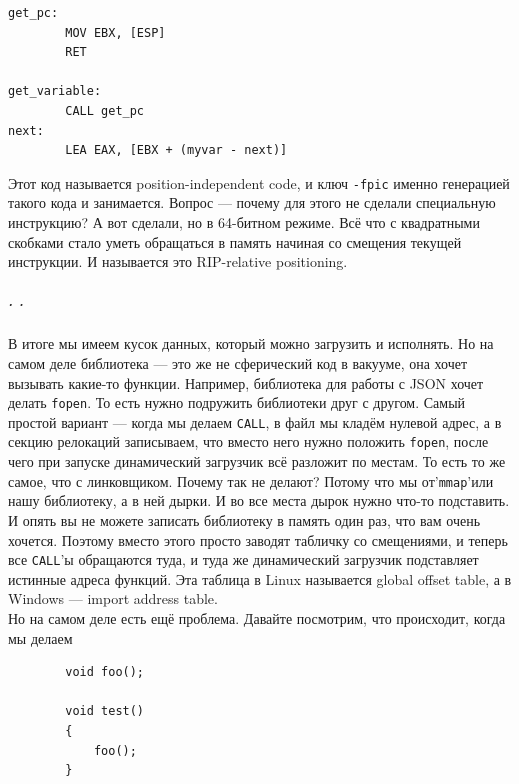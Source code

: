 \documentclass{article}
\newcommand{\asm}[1]{\texttt{#1}}
\begin{document}
    \begin{verbatim}
get_pc:
        MOV EBX, [ESP]
        RET

get_variable:
        CALL get_pc
next:
        LEA EAX, [EBX + (myvar - next)]
    \end{verbatim}
    Этот код называется position-independent code, и ключ \texttt{-fpic} именно генерацией такого кода и занимается. Вопрос --- почему для этого не сделали специальную инструкцию? А вот сделали, но в 64-битном режиме. Всё что с квадратными скобками стало уметь обращаться в память начиная со смещения текущей инструкции. И называется это RIP-relative positioning.
    \subparagraph{. .}
    В итоге мы имеем кусок данных, который можно загрузить и исполнять. Но на самом деле библиотека --- это же не сферический код в вакууме, она хочет вызывать какие-то функции. Например, библиотека для работы с JSON хочет делать \texttt{fopen}. То есть нужно подружить библиотеки друг с другом. Самый простой вариант --- когда мы делаем \asm{CALL}, в файл мы кладём нулевой адрес, а в секцию релокаций записываем, что вместо него нужно положить \texttt{fopen}, после чего при запуске динамический загрузчик всё разложит по местам. То есть то же самое, что с линковщиком. Почему так не делают? Потому что мы от'\texttt{mmap}'или нашу библиотеку, а в ней дырки. И во все места дырок нужно что-то подставить. И опять вы не можете записать библиотеку в память один раз, что вам очень хочется. Поэтому вместо этого просто заводят табличку со смещениями, и теперь все \asm{CALL}'ы обращаются туда, и туда же динамический загрузчик подставляет истинные адреса функций. Эта таблица в Linux называется global offset table, а в Windows --- import address table.\\
    Но на самом деле есть ещё проблема. Давайте посмотрим, что происходит, когда мы делаем
    \begin{verbatim}
        void foo();

        void test()
        {
            foo();
        }
    \end{verbatim}
\end{document}
